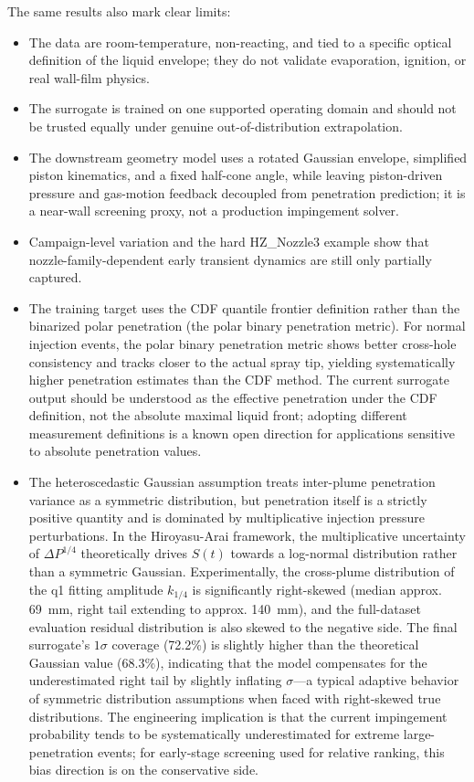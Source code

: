 \documentclass[english, 12pt, a4paper, elec, utf8, a-2b, online]{aaltothesis}
\begin{document}
The same results also mark clear limits:
\begin{itemize}
  \item The data are room-temperature, non-reacting, and tied to a specific optical definition of the liquid envelope; they do not validate evaporation, ignition, or real wall-film physics.
  \item The surrogate is trained on one supported operating domain and should not be trusted equally under genuine out-of-distribution extrapolation.
  \item The downstream geometry model uses a rotated Gaussian envelope, simplified piston kinematics, and a fixed half-cone angle, while leaving piston-driven pressure and gas-motion feedback decoupled from penetration prediction; it is a near-wall screening proxy, not a production impingement solver.
  \item Campaign-level variation and the hard HZ\_Nozzle3 example show that nozzle-family-dependent early transient dynamics are still only partially captured.
  \item The training target uses the CDF quantile frontier definition rather than the binarized polar penetration (the polar binary penetration metric). For normal injection events, the polar binary penetration metric shows better cross-hole consistency and tracks closer to the actual spray tip, yielding systematically higher penetration estimates than the CDF method. The current surrogate output should be understood as the effective penetration under the CDF definition, not the absolute maximal liquid front; adopting different measurement definitions is a known open direction for applications sensitive to absolute penetration values.
  \item The heteroscedastic Gaussian assumption treats inter-plume penetration variance as a symmetric distribution, but penetration itself is a strictly positive quantity and is dominated by multiplicative injection pressure perturbations. In the Hiroyasu-Arai framework, the multiplicative uncertainty of $\Delta P^{1/4}$ theoretically drives $S(t)$ towards a log-normal distribution rather than a symmetric Gaussian. Experimentally, the cross-plume distribution of the q1 fitting amplitude $k_{1/4}$ is significantly right-skewed (median approx. \SI{69}{mm}, right tail extending to approx. \SI{140}{mm}), and the full-dataset evaluation residual distribution is also skewed to the negative side. The final surrogate's $1\sigma$ coverage (72.2\%) is slightly higher than the theoretical Gaussian value (68.3\%), indicating that the model compensates for the underestimated right tail by slightly inflating $\sigma$---a typical adaptive behavior of symmetric distribution assumptions when faced with right-skewed true distributions. The engineering implication is that the current impingement probability tends to be systematically underestimated for extreme large-penetration events; for early-stage screening used for relative ranking, this bias direction is on the conservative side.

\end{itemize}
\end{document}
